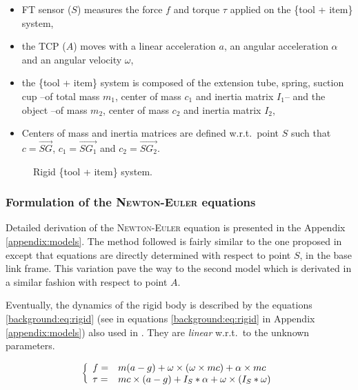 \documentclass[/home/francois/latex/report/main.tex]{subfiles}
\begin{document}
\begin{itemize}
 \item \ac{FT} sensor ($S$) measures the force $f$ and torque $\tau$ applied on the \{tool + item\} system,
 \item the \ac{TCP} ($A$) moves with a linear acceleration $a$, an angular acceleration $\alpha$ and an angular velocity $\omega$,
 \item the \{tool + item\} system is composed of the extension tube, spring, suction cup –of total mass $m_1$, center of mass $c_1$ and inertia matrix $I_1$– and the object –of mass $m_2$, center of mass $c_2$ and inertia matrix $I_2$,
 \item Centers of mass and inertia matrices are defined w.r.t.\ point $S$ such that $c = \overrightarrow{SG}$, $c_1 = \overrightarrow{SG_1}$ and $c_2 = \overrightarrow{SG_2}$.
\end{itemize}

\begin{figure}
\centering
   \caption{Rigid \{tool + item\} system.}
   \label{fig:tikz:one_body}
\end{figure}

\subsubsection{Formulation of the \textsc{Newton-Euler} equations}
\label{subsubsection:background_newton_equation}

Detailed derivation of the \textsc{Newton-Euler} equation is presented in the Appendix \ref{appendix:models}. The method followed is fairly similar to the one proposed in \cite{An1985} except that equations are directly determined with respect to point $S$, in the base link frame. This variation pave the way to the second model which is derivated in a similar fashion with respect to point $A$.

Eventually, the dynamics of the rigid body is described by the equations \ref{background:eq:rigid} (see in equations \ref{background:eq:rigid} in Appendix \ref{appendix:models}) also used in \cite{Kubus2008, Kubus2007, Kubus2014, Farsoni2018}. They are \textit{linear} w.r.t.\ to the unknown parameters.

\begin{equation}
 \label{background:eq:rigid}
 \left \{
 \begin{array}{l l}
  f =    & m (a - g) + \omega \times (\omega \times m c) + \alpha \times m c \\
  \tau = & m c \times (a - g)
  + I_{S} \ast \alpha + \omega \times (I_{S} \ast \omega)
 \end{array}
 \right.
\end{equation}
\end{document}
